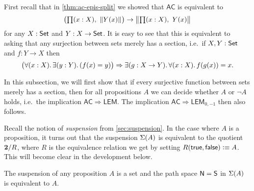 First recall that in \autoref{thm:ac-epis-split} we showed that $\mathsf{AC}$ is equivalent to
\[ \big(\prd{x:X} \brck{Y(x)}\big) \to \bbrck{\prd{x:X} Y(x)} \]
for any $X:\mathsf{Set}$ and $Y:X\to\mathsf{Set}$.
It is easy to see that this is equivalent to asking that any surjection between sets merely has a section, i.e.\ if $X,Y:\mathsf{Set}$ and $f:Y\to X$ then
\[ \big(\fall{x:X}\exis{y:Y} (f(x)=y)\big) \Rightarrow \exis{g:X\to Y}\fall{x:X} f(g(x))=x. \]

In this subsection, we will first show that if every surjective function between sets merely has
a section, then for all propositions $A$ we can decide whether $A$ or $\neg A$
holds, i.e.\ the implication $\mathsf{AC} \Rightarrow \mathsf{LEM}$.  The implication $\mathsf{AC} \Rightarrow \mathsf{LEM}_{0,-1}$ then also follows.

Recall the notion of \emph{suspension} from \autoref{sec:suspension}.
In the case where $A$ is a proposition, it turns out that the
suspension $\Sigma(A)$ is equivalent to the quotient $\mathbf{2}/R$,
where $R$ is the equivalence relation we get by setting
$R(\mathsf{true},\mathsf{false})\vcentcolon\equiv A$. This will become clear in the development
below.

\begin{lem}\label{prop:trunc_of_prop_is_set}
The suspension of any proposition $A$ is a set and the path space 
$\mathsf{N}=\mathsf{S}$ in $\Sigma(A)$ is equivalent to $A$. 
\end{lem}

